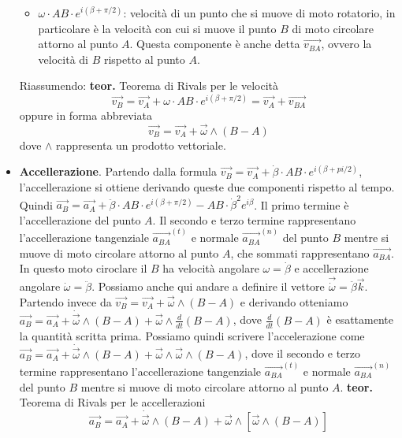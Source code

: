 \begin{itemize}
\begin{itemize}
        \item $\omega \cdot AB \cdot e^{i(\beta + \pi/2)}$: velocità di un punto che si muove di moto rotatorio, in particolare è la velocità con cui si muove il punto $B$ di moto circolare attorno al punto $A$. Questa componente è anche detta $\vec{v_{BA}}$, ovvero la velocità di $B$ rispetto al punto $A$.
    \end{itemize}
    Riassumendo: \newline
    \textbf{teor.} Teorema di Rivals per le velocità
    \[
        \vec{v_B} = \vec{v_A} + \omega \cdot AB \cdot e^{i(\beta + \pi/2)} = \vec{v_A} + \vec{v_{BA}}
    \]
    oppure in forma abbreviata
    \[
        \vec{v_B} = \vec{v_A} + \vec{\omega}\land(B-A)
    \]
    dove $\land$ rappresenta un prodotto vettoriale.
    \item \textbf{Accellerazione}. Partendo dalla formula $\vec{v_B} = \vec{v_A} + \dot{\beta} \cdot AB \cdot e^{i(\beta + pi/2)}$, l'accellerazione si ottiene derivando queste due componenti rispetto al tempo.\newline
    Quindi $\vec{a_B} = \vec{a_A} + \ddot{\beta} \cdot AB \cdot e^{i(\beta+\pi/2)}-AB \cdot \dot{\beta}^2 e^{i \beta}$.\newline
    Il primo termine è l'accellerazione del punto $A$. Il secondo e terzo termine rappresentano l'accellerazione tangenziale $\vec{a_{BA}}^{(t)}$ e normale $\vec{a_{BA}}^{(n)}$ del punto $B$ mentre si muove di moto circolare attorno al punto $A$, che sommati rappresentano $\vec{a_{BA}}$. In questo moto ciroclare il $B$ ha velocità angolare $\omega = \dot{\beta}$ e accellerazione angolare $\dot{\omega} = \ddot{\beta}$. Possiamo anche qui andare a definire il vettore $\vec{\dot{\omega}} = \ddot{\beta}\vec{k}$.\newline
    Partendo invece da $\vec{v_B} = \vec{v_A} + \vec{\omega}\land(B-A)$ e derivando otteniamo $\vec{a_B} = \vec{a_A} + \dot{\vec{\omega}}\land (B-A) + \vec{\omega} \land \frac{d}{dt}(B-A)$, dove $\frac{d}{dt}(B-A)$ è esattamente la quantità scritta prima. Possiamo quindi scrivere l'accelerazione come $\vec{a_B}= \vec{a_A} + \dot{\vec{\omega}} \land (B-A) + \vec{\omega} \land \vec{\omega} \land (B-A)$, dove il secondo e terzo termine rappresentano l'accellerazione tangenziale $\vec{a_{BA}}^{(t)}$ e normale $\vec{a_{BA}}^{(n)}$ del punto $B$ mentre si muove di moto circolare attorno al punto $A$.\newline
    \textbf{teor.} Teorema di Rivals per le accellerazioni
    \[
        \vec{a_B}= \vec{a_A} + \dot{\vec{\omega}} \land (B-A) + \vec{\omega} \land [\vec{\omega} \land (B-A)]
    \]
\end{itemize}